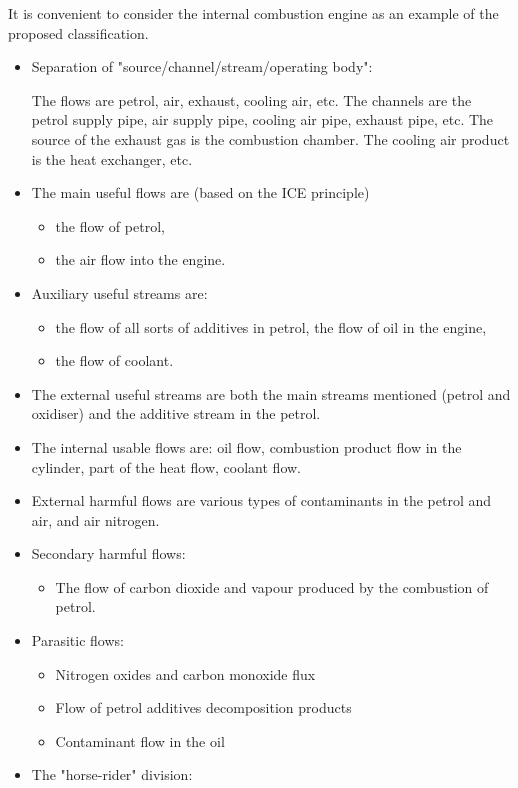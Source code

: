 \documentclass[a4paper,11pt]{article}
\begin{document}
It is convenient to consider the internal combustion engine as an example of
the proposed classification.
\begin{itemize}
\item Separation of "source/channel/stream/operating body":

The flows are petrol, air, exhaust, cooling air, etc. The channels are the
petrol supply pipe, air supply pipe, cooling air pipe, exhaust pipe, etc. The
source of the exhaust gas is the combustion chamber. The cooling air product
is the heat exchanger, etc.
\item The main useful flows are (based on the ICE principle)
  \begin{itemize}
  \item the flow of petrol,
  \item the air flow into the engine.
  \end{itemize}
\item Auxiliary useful streams are:
  \begin{itemize}
  \item the flow of all sorts of additives in petrol, the flow of oil in the
    engine, 
  \item the flow of coolant.
  \end{itemize}
\item The external useful streams are both the main streams mentioned (petrol
  and oxidiser) and the additive stream in the petrol.
\item The internal usable flows are: oil flow, combustion product flow in the
  cylinder, part of the heat flow, coolant flow.
\item External harmful flows are various types of contaminants in the petrol
  and air, and air nitrogen.
\item Secondary harmful flows:
  \begin{itemize}
  \item The flow of carbon dioxide and vapour produced by the combustion of
    petrol.
  \end{itemize}
\item Parasitic flows:
  \begin{itemize}
  \item Nitrogen oxides and carbon monoxide flux
  \item Flow of petrol additives decomposition products
  \item Contaminant flow in the oil
  \end{itemize}
\item The "horse-rider" division:

\end{itemize}
\end{document}
